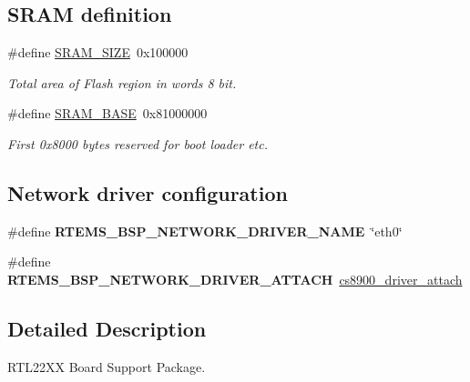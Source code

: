 \subsection*{S\+R\+AM definition}
\begin{DoxyCompactItemize}
\item 
\mbox{\label{group__RTEMSBSPsARMRTL22XX_ga10a9c742edabf5e945a1c509b7e1451e}} 
\#define \mbox{\hyperlink{group__RTEMSBSPsARMRTL22XX_ga10a9c742edabf5e945a1c509b7e1451e}{S\+R\+A\+M\+\_\+\+S\+I\+ZE}}~0x100000
\begin{DoxyCompactList}\small\item\em Total area of Flash region in words 8 bit. \end{DoxyCompactList}\item 
\mbox{\label{group__RTEMSBSPsARMRTL22XX_ga05e8f3d2e5868754a7cd88614955aecc}} 
\#define \mbox{\hyperlink{group__RTEMSBSPsARMRTL22XX_ga05e8f3d2e5868754a7cd88614955aecc}{S\+R\+A\+M\+\_\+\+B\+A\+SE}}~0x81000000
\begin{DoxyCompactList}\small\item\em First 0x8000 bytes reserved for boot loader etc. \end{DoxyCompactList}\end{DoxyCompactItemize}
\subsection*{Network driver configuration}
\begin{DoxyCompactItemize}
\item 
\mbox{\label{group__RTEMSBSPsARMRTL22XX_ga86d4f9aa98431100692e31068070a8df}} 
\#define {\bfseries R\+T\+E\+M\+S\+\_\+\+B\+S\+P\+\_\+\+N\+E\+T\+W\+O\+R\+K\+\_\+\+D\+R\+I\+V\+E\+R\+\_\+\+N\+A\+ME}~\char`\"{}eth0\char`\"{}
\item 
\mbox{\label{group__RTEMSBSPsARMRTL22XX_gadde0d66aef9442971dde465292ac14e6}} 
\#define {\bfseries R\+T\+E\+M\+S\+\_\+\+B\+S\+P\+\_\+\+N\+E\+T\+W\+O\+R\+K\+\_\+\+D\+R\+I\+V\+E\+R\+\_\+\+A\+T\+T\+A\+CH}~\mbox{\hyperlink{group__RTEMSBSPsARMEDB7312_ga6bc0d2aa6cdac399f8e347a93b8ca804}{cs8900\+\_\+driver\+\_\+attach}}
\end{DoxyCompactItemize}


\subsection{Detailed Description}
R\+T\+L22\+XX Board Support Package. 



